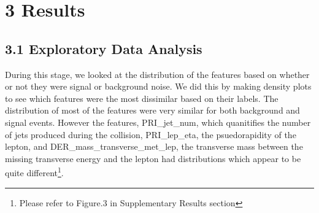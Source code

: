 \documentclass[11pt]{article}
\begin{document}





\vspace{30pt}

\section*{3 Results}
\subsection*{3.1 Exploratory Data Analysis}
During this stage, we looked at the distribution of the features based on whether or not they were signal or background noise. We did this by making density plots to see which features were the most dissimilar based on their labels. The distribution of most of the features were very similar for both background and signal events. However the features, PRI\_jet\_num, which quanitifies the number of jets produced during the collision, PRI\_lep\_eta, the psuedorapidity of the lepton, and DER\_mass\_transverse\_met\_lep, the transverse mass between the missing transverse energy
and the lepton had distributions which appear to be quite different\footnote{Please refer to Figure.3 in Supplementary Results section}. 
\end{document}

